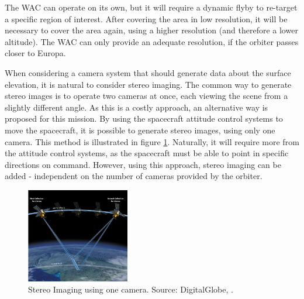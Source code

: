 The WAC can operate on its own, but it will require a dynamic flyby to re-target a specific region of interest. After covering the area in low resolution, it will be necessary to cover the area again, using a higher resolution (and therefore a lower altitude). The WAC can only provide an adequate resolution, if the orbiter passes closer to Europa. 

When considering a camera system that should generate data about the surface elevation, it is natural to consider stereo imaging. The common way to generate stereo images is to operate two cameras at once, each viewing the scene from a slightly different angle. As this is a costly approach, an alternative way is proposed for this mission. By using the spacecraft attitude control systems to move the spacecraft, it is possible to generate stereo images, using only one camera. This method is illustrated in figure \ref{fig:stereoimg}. Naturally, it will require more from the attitude control systems, as the spacecraft must be able to point in specific directions on command. However, using this approach, stereo imaging can be added - independent on the number of cameras provided by the orbiter.

\begin{figure}[h!]
\centering
\includegraphics[width=0.4\textwidth]{figures/Orbiter/Stereo_Satellite.png}
\caption{Stereo Imaging using one camera. Source: DigitalGlobe, \cite{satimgcorp2015}.}
\label{fig:stereoimg}
\end{figure}

